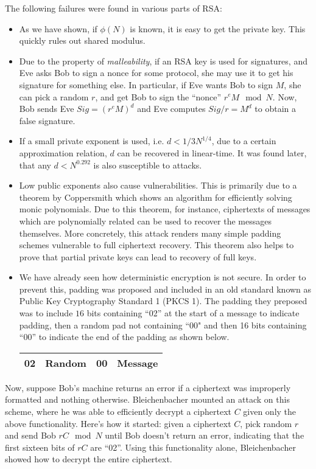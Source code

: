 The following failures were found in various parts of RSA:
\begin{itemize}
\item As we have shown, if $\phi(N)$ is known, it is easy to get the private key. This quickly rules out shared modulus.
\item Due to the property of \emph{malleability}, if an RSA key is used for signatures, and Eve asks Bob to sign a nonce for some protocol, she may use it to get his signature for something else. In particular, if Eve wants Bob to sign $M$, she can pick a random $r$, and get Bob to sign the ``nonce'' $r^e M\mod N$. Now, Bob sends Eve $Sig = (r^e M)^d$ and Eve computes $Sig/r = M^d$ to obtain a false signature.
\item If a small private exponent is used, i.e. $d<1/3 N^{1/4}$, due to a certain approximation relation, $d$ can be recovered in linear-time. It was found later, that any $d<N^{0.292}$ is also susceptible to attacks.
\item Low public exponents also cause vulnerabilities. This is primarily due to a theorem by Coppersmith which shows an algorithm for efficiently solving monic polynomials. Due to this theorem, for instance, ciphertexts of messages which are polynomially related can be used to recover the messages themselves. More concretely, this attack renders many simple padding schemes vulnerable to full ciphertext recovery. This theorem also helps to prove that partial private keys can lead to recovery of full keys. 
\item We have already seen how deterministic encryption is not secure. In order to prevent this, padding was proposed and included in an old standard known as Public Key Cryptography Standard 1 (PKCS 1). The padding they preposed was to include $16$ bits containing ``02'' at the start of a message to indicate padding, then a random pad not containing ``00" and then 16 bits containing ``00'' to indicate the end of the padding as shown below.
\begin{table}[H]
\centering
\begin{tabular}{| c | c | c | c |}\hline
02 & Random & 00 & Message \\ \hline
\end{tabular}
\end{table}
\end{itemize}
Now, suppose Bob's machine returns an error if a ciphertext was improperly formatted and nothing otherwise. Bleichenbacher mounted an attack on this scheme, where he was able to efficiently decrypt a ciphertext $C$ given only the above functionality. Here's how it started: given a ciphertext $C$, pick random $r$ and send Bob $rC\mod N$ until Bob doesn't return an error, indicating that the first sixteen bits of $rC$ are ``02''. Using this functionality alone, Bleichenbacher showed how to decrypt the entire ciphertext.  

